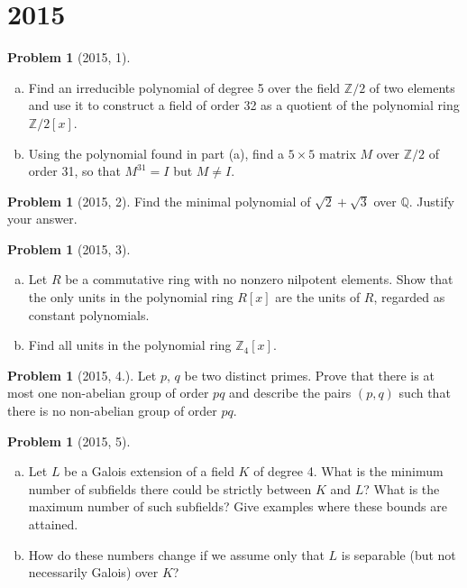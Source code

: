 \documentclass{article}
\newcommand{\<}{\langle} %
\renewcommand{\>}{\rangle} %
\theoremstyle{plain}
\theoremstyle{remark}
\theoremstyle{definition}
\newtheorem{examproblem}[equation]{Problem}
\begin{document}
\section{2015}

\begin{examproblem}[2015, 1]
	\begin{enumerate}[(a)]
		\item Find an irreducible polynomial of degree 5 over the
			field $\mathbb Z/2$ of two elements and use it to construct
			a field of order 32 as a quotient of the
			polynomial ring $\mathbb Z/2[x]$.
		\item Using the polynomial found in part (a), find a $5\times5$
			matrix $M$ over $\mathbb Z/2$ of order 31, so that $M^{31}=I$
			but $M\neq I$.
	\end{enumerate}
\end{examproblem}

\begin{examproblem}[2015, 2]
	Find the minimal polynomial of $\sqrt2+\sqrt3$ over $\mathbb Q$.
	Justify your answer.
\end{examproblem}



\begin{examproblem}[2015, 3]
	\begin{enumerate}[(a)]
		\item Let $R$ be a commutative ring with no nonzero nilpotent
			elements. Show that the only units in the polynomial ring
			$R[x]$ are the units of $R$, regarded as constant polynomials.
		\item Find all units in the polynomial ring $\mathbb Z_4[x]$.
	\end{enumerate}
\end{examproblem}

\begin{examproblem}[2015, 4.]
	Let $p$, $q$ be two distinct primes. Prove that there is at most one
	non-abelian group of order $pq$ and describe the pairs $(p,q)$
	such that there is no non-abelian group of order $pq$.
\end{examproblem}


\begin{examproblem}[2015, 5]
	\begin{enumerate}[(a)]
		\item Let $L$ be a Galois extension of a field $K$ of degree 4.
			What is the minimum number of subfields there could
			be strictly between $K$ and $L$? What is the maximum
			number of such subfields? Give examples where these
			bounds are attained.
		\item How do these numbers change if we assume only that $L$
			is separable (but not necessarily Galois) over $K$?
	\end{enumerate}

\end{examproblem}
\end{document}
